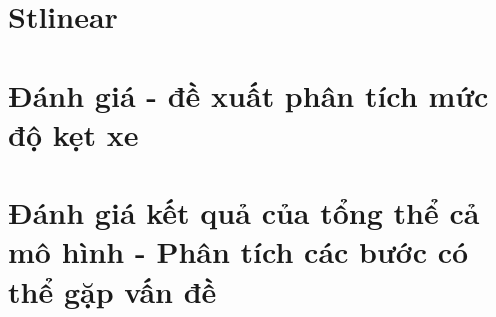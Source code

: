 \documentclass[a4paper]{article}
\theoremstyle{definition}
\begin{document}
\section{Stlinear}
\section{Đánh giá - đề xuất phân tích mức độ kẹt xe}
\section{ Đánh giá kết quả của tổng thể cả mô hình - Phân tích các bước có thể gặp vấn đề}
\section{}

% 
% 
% 
% 
% 
% 
% 

\newpage

\end{document}
